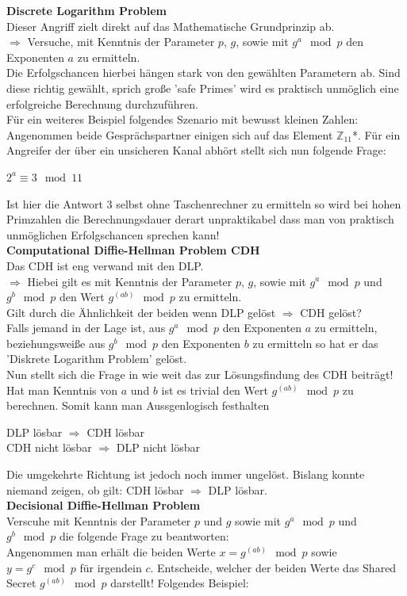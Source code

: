 \documentclass[a4paper,12pt]{scrartcl}
\begin{document}
\newpage
\textbf{Discrete Logarithm Problem}\\
Dieser Angriff zielt direkt auf das Mathematische Grundprinzip ab.\\
$\Rightarrow$
Versuche, mit Kenntnis der Parameter $p$, $g$, sowie mit $g^a \mod p$ den Exponenten $a$ zu
ermitteln.\\
 Die Erfolgschancen hierbei hängen  stark von den gewählten Parametern ab. Sind diese richtig gewählt, sprich große 'safe Primes' wird es praktisch unmöglich eine erfolgreiche Berechnung durchzuführen.\\
Für ein weiteres Beispiel folgendes Szenario mit bewusst kleinen Zahlen:\\
Angenommen beide Gesprächspartner einigen sich auf das Element $\mathbb{Z}_{11}$*. Für ein Angreifer der über ein unsicheren Kanal abhört stellt sich nun folgende Frage:\\
\begin{center}
 $2^a \equiv 3 \mod 11$
\end{center}
Ist hier die Antwort $3$ selbst ohne Taschenrechner zu ermitteln so wird bei hohen Primzahlen die Berechnungsdauer derart unpraktikabel dass man von praktisch unmöglichen Erfolgschancen sprechen kann!
\\
\newline
\textbf{Computational Diffie-Hellman Problem CDH}\\
Das CDH ist eng verwand mit den DLP.\\
$\Rightarrow$ Hiebei gilt es mit Kenntnis der Parameter $p$, $g$, sowie mit $g^a \mod p$ und $g^b \mod p$ den Wert $g^(ab) \mod p$ zu ermitteln.\\
Gilt durch die Ähnlichkeit der beiden wenn DLP gelöst $\Rightarrow$ CDH gelöst?\\

Falls jemand in der Lage ist, aus $g^a \mod p$ den Exponenten $a$ zu ermitteln, beziehungsweiße aus $g^b \mod p$ den Exponenten $b$ zu ermitteln so hat er das 'Diskrete Logarithm Problem' gelöst.\\
Nun stellt sich die Frage in wie weit das zur Lösungsfindung des  CDH beiträgt!\\
Hat man Kenntnis von $a$ und $b$ ist es trivial den Wert $g^(ab) \mod p$ zu berechnen. Somit kann man Aussgenlogisch festhalten
\begin{center}
 DLP lösbar $\Rightarrow$ CDH lösbar\\
 CDH nicht lösbar $\Rightarrow$ DLP nicht lösbar
\end{center}
Die umgekehrte Richtung ist jedoch noch immer ungelöst. Bislang konnte niemand zeigen,
ob gilt: CDH lösbar $\Rightarrow$ DLP lösbar.
\\
\newline
\textbf{Decisional Diffie-Hellman Problem}\\

Verscuhe mit Kenntnis der Parameter $p$ und $g$ sowie mit $g^a \mod p$  und $g^b \mod p$ die folgende Frage zu beantworten:\\
Angenommen man erhält die beiden Werte $x = g^(ab) \mod p$ sowie $y = g^c \mod p$ für irgendein $c$. Entscheide, welcher der beiden Werte das Shared Secret $g^(ab) \mod p$ darstellt!
Folgendes Beispiel:
\end{document}
